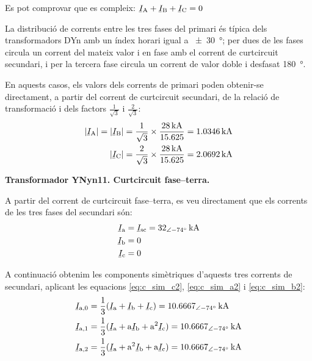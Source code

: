 \begin{exemple}
    Es pot comprovar que es compleix: $\cmplx{I}\ped{A} + \cmplx{I}\ped{B} + \cmplx{I}\ped{C} = 0$

    La distribució de corrents entre les tres fases del primari és típica dels transformadors DYn amb un índex horari igual a \SI{+-30}{\degree}; per dues de les fases circula un corrent del mateix valor i en fase amb el corrent de curtcircuit secundari, i per la tercera fase circula un corrent de valor doble i desfasat \SI{180}{\degree}.

    En aquests casos, els valors dels corrents de primari poden obtenir-se directament, a partir del corrent de curtcircuit secundari, de la relació de transformació i dels factors $\frac{1}{\sqrt{3}}$ i  $\frac{2}{\sqrt{3}}$:
    \begin{align*}
        |\cmplx{I}\ped{A}| = |\cmplx{I}\ped{B}| = \frac{1}{\sqrt{3}} \times \frac{\SI{28}{kA}}{\num{15,625}} = \SI{1,0346}{kA} \\
        |\cmplx{I}\ped{C}|= \frac{2}{\sqrt{3}} \times \frac{\SI{28}{kA}}{\num{15,625}} = \SI{2,0692}{kA}
    \end{align*}

    \break
    \textbf{ Transformador YNyn11. Curtcircuit fase--terra.}

    \begin{center}
       
    \end{center}

    A partir del corrent de curtcircuit fase--terra, es veu directament que els corrents de les tres fases del secundari són:
    \begin{align*}
        \cmplx{I}\ped{a} &= \cmplx{I}\ped{sc} = \SIpd{32}{-74}{kA} \\
        \cmplx{I}\ped{b} &= 0  \\
        \cmplx{I}\ped{c} &= 0
    \end{align*}

    A continuació obtenim les components simètriques d'aquests tres corrents de secundari, aplicant les equacions \eqref{eq:c_sim_c2}, \eqref{eq:c_sim_a2} i \eqref{eq:c_sim_b2}:
    \begin{align*}
        \cmplx{I}\ped{a,0} &= \frac{1}{3} (\cmplx{I}\ped{a} + \cmplx{I}\ped{b} +
        \cmplx{I}\ped{c}) = \SIpd{10,6667}{-74}{kA} \\
        \cmplx{I}\ped{a,1} &= \frac{1}{3} (\cmplx{I}\ped{a} + \au \cmplx{I}\ped{b} +
         \au^2 \cmplx{I}\ped{c}) = \SIpd{10,6667}{-74}{kA}  \\
        \cmplx{I}\ped{a,2} &= \frac{1}{3} (\cmplx{I}\ped{a} + \au^2 \cmplx{I}\ped{b} +
         \au \cmplx{I}\ped{c}) = \SIpd{10,6667}{-74}{kA}
    \end{align*}


\end{exemple}
